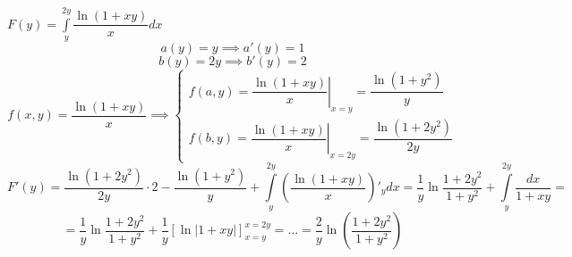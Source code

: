 \documentclass[../../main.tex]{subfiles}
\begin{document}
\begin{example}
    $F(y) = \int\limits_y^{2y} \dfrac{\ln (1 + xy)}{x} dx$
    \[ a(y) = y \implies a'(y) = 1 \]
    \[ b(y) = 2y \implies b'(y) = 2 \]
    \[ f(x, y) = \dfrac{\ln (1 + xy)}{x} \implies
    \begin{cases}
        f(a, y) = \left. \dfrac{\ln (1 + xy)}{x} \right\vert_{x = y}
        = \dfrac{\ln (1 + y^2)}{y} \\
        f(b, y) = \left. \dfrac{\ln (1 + xy)}{x} \right\vert_{x = 2y}
        = \dfrac{\ln (1 + 2y^2)}{2y}
    \end{cases}
    \]
    \[F'(y) = \dfrac{\ln (1 + 2y^2)}{2y} \cdot 2 -\dfrac{\ln (1 + y^2)}{y}
    + \int\limits_y^{2y} \left( \dfrac{\ln (1 + xy)}{x} \right)'_y dx =
    \dfrac{1}{y} \ln \dfrac{1 + 2y^2}{1 + y^2} +
    \int\limits_y^{2y} \dfrac{dx}{1 + xy} = \]
    \[ = \dfrac{1}{y} \ln \dfrac{1 + 2y^2}{1 + y^2}
    +  \dfrac{1}{y} \left[ \ln \left|1 + xy \right| \right]_{x = y}^{x = 2y}
    = \ldots =  \dfrac{2}{y} \ln \left( \dfrac{1 + 2y^2}{1 + y^2} \right) \]
\end{example}
\end{document}
